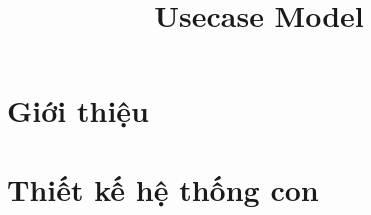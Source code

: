 \documentclass[12pt, a4paper]{article}
\title{Usecase Model}
\begin{document}

\clearpage


\clearpage

\tableofcontents
\clearpage

\section{Giới thiệu}

\clearpage

\section{Thiết kế hệ thống con}

\clearpage

\clearpage

\clearpage
\glsaddall
\printglossary[title={Giải thích thuật ngữ}]
\end{document}
